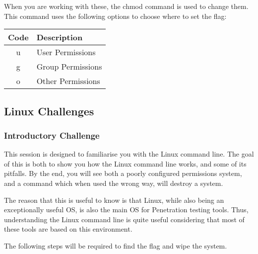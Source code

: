 				When you are working with these, the chmod command is used to change them.
				This command uses the following options to choose where to set the flag:
				\begin{center}
					\begin{tabular}{c l }
						\toprule
						\textbf{Code} & \textbf{Description} \\
						\toprule
						u & User Permissions \\
						g & Group Permissions \\
						o & Other Permissions \\
						\bottomrule
					\end{tabular}
				\end{center}
		\subsection{Linux Challenges}
			\subsubsection{Introductory Challenge}
				This session is designed to familiarise you with the Linux command line.
				The goal of this is both to show you how the Linux command line works, and some of its pitfalls.
				By the end, you will see both a poorly configured permissions system, and a command which when used the wrong way, will destroy a system.

				The reason that this is useful to know is that Linux, while also being an exceptionally useful OS, is also the main OS for Penetration testing tools.
				Thus, understanding the Linux command line is quite useful considering that most of these tools are based on this environment.

				The following steps will be required to find the flag and wipe the system.

